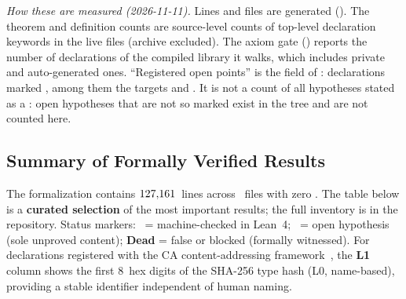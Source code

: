 \noindent\emph{How these are measured (2026-11-11).}  Lines and files
are generated ().  The theorem and
definition counts are source-level counts of top-level declaration
keywords in the live files (archive excluded).  The axiom gate
() reports the number of declarations of
the compiled library it walks, which includes private and
auto-generated ones.  ``Registered open points'' is the
 field of : declarations
marked , among them the targets
 and .  It is not a
count of all hypotheses stated as a : open hypotheses that
are not so marked exist in the tree and are not counted here.

\subsection{Summary of Formally Verified Results}
\label{sec:verified-results}

The formalization contains $127{,}161$~lines across \EMFileCount~files with
zero .  The table below is a \textbf{curated selection} of
the most important results; the full inventory is in the repository.
Status markers: \proved\ = machine-checked in Lean~4;
\openhyp\ = open hypothesis (sole unproved content);
\textbf{Dead} = false or blocked (formally witnessed).
For declarations registered with the CA content-addressing
framework~\cite{CA2026}, the \textbf{L1} column shows the first 8~hex
digits of the SHA-256 type hash (L0, name-based), providing a
stable identifier independent of human naming.


